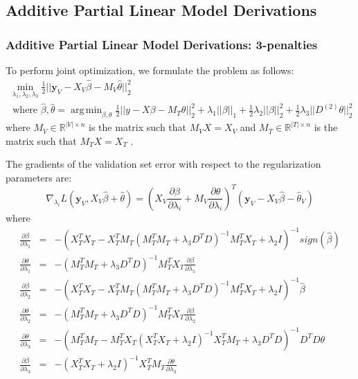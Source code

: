 \documentclass[10pt,letterpaper]{article}
\DeclareMathOperator*{\argmin}{arg\,min}
\begin{document}
\subsection{Additive Partial Linear Model Derivations}

\subsubsection{Additive Partial Linear Model Derivations: 3-penalties}

To perform joint optimization, we formulate the problem as follows:
\begin{multline}
\min_{\lambda_1, \lambda_2, \lambda_3} \frac{1}{2} \bigl\lvert\bigl\lvert \boldsymbol y_V - X_V\hat\beta - M_V \hat\theta \bigl\rvert\bigl\rvert^2_2 \\
\text{ where } \hat\beta, \hat\theta = \argmin_{\beta, \theta} \frac{1}{2} \bigl\lvert\bigl\lvert y - X\beta - M_T \theta \bigl\rvert\bigl\rvert^2_2
+ \lambda_1 \lvert\lvert \beta \rvert \rvert_1
+ \frac{1}{2} \lambda_2 \lvert\lvert \beta \rvert \rvert_2^2
+ \frac{1}{2} \lambda_3 \lvert\lvert D^{(2)} \theta \rvert \rvert_2^2
\end{multline}
where $M_V \in \mathbb{R}^{|V| \times n}$ is the matrix such that $M_V X = X_V$ and $M_T \in \mathbb{R}^{|T| \times n}$ is the matrix such that $M_T X = X_T$ .

The gradients of the validation set error with respect to the regularization parameters are:
\begin{equation}
\nabla_{\lambda_i} L(\boldsymbol y_V, X_V \hat \beta + \hat \theta) = (X_V \frac{\partial \beta}{\partial \lambda_i} + M_V \frac{\partial \theta}{\partial \lambda_i})^T(\boldsymbol y_V - X_V \hat \beta - \hat \theta_V)
\end{equation}
where
\begin{equation}
\begin{array}{lcl}
\frac{\partial \beta}{\partial \lambda_1} &=& -(X_T^T X_T - X_T^T M_T(M_T^T M_T + \lambda_3 D^TD)^{-1} M_T^T X_T + \lambda_2 I)^{-1} sign(\hat \beta) \\
\frac{\partial \theta}{\partial \lambda_1} &=& -(M_T^T M_T + \lambda_3 D^T D)^{-1}  M_T^T X_T \frac{\partial \beta}{\partial \lambda_1}
\\
\frac{\partial \beta}{\partial \lambda_2} &=& -(X_T^T X_T - X_T^T M_T(M_T^T M_T + \lambda_3 D^TD)^{-1} M_T^T X_T + \lambda_2 I)^{-1} \hat \beta \\
\frac{\partial \theta}{\partial \lambda_2} &=& -(M_T^T M_T + \lambda_3 D^T D)^{-1}  M_T^T X_T \frac{\partial \beta}{\partial \lambda_2}
\\
\frac{\partial \theta}{\partial \lambda_3} &=& -(M_T^T M_T - M_T^T X_T (X_T^TX_T + \lambda_2 I)^{-1} X_T^T M_T + \lambda_3 D^TD)^{-1} D^TD \theta
\\
\frac{\partial \beta}{\partial \lambda_3} &=& - (X_T^TX_T + \lambda_2 I)^{-1} X_T^T M_T \frac{\partial \theta}{\partial \lambda_3} \\
\end{array}
\end{equation}
\end{document}
